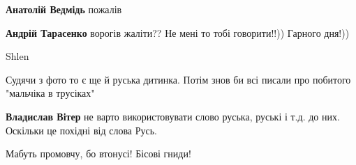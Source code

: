 \begin{itemize}
\begin{itemize}
 
\textbf{Анатолій Ведмідь} пожалів

 
\textbf{Андрій Тарасенко} ворогів жаліти?? Не мені то тобі говорити!!))
Гарного дня!))
\end{itemize}

 

Shlen

 
Судячи з фото то є ще й руська дитинка. Потім знов би всі писали про
побитого "мальчіка в трусіках"

\begin{itemize}
 
\textbf{Владислав Вітер} не варто використовувати слово руська, руські і т.д. до них. Оскільки це похідні від слова Русь.
\end{itemize}

 
Мабуть промовчу, бо втонусі!
Бісові гниди!


\end{itemize}
